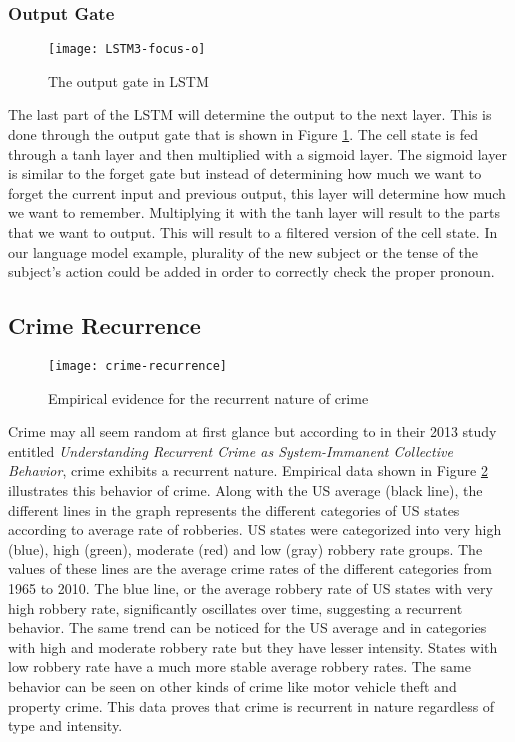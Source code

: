     \subsubsection{Output Gate}
        \begin{figure}[H]
        \centering
        \texttt{[image: LSTM3-focus-o]}
        \caption{The output gate in LSTM \cite{olah2015understanding}}
        \label{fig:lstm-output-gate}
        \end{figure}
        The last part of the LSTM will determine the output to the next layer. This is done through the output gate that is shown in Figure \ref{fig:lstm-output-gate}. The cell state is fed through a tanh layer and then multiplied with a sigmoid layer. The sigmoid layer is similar to the forget gate but instead of determining how much we want to forget the current input and previous output, this layer will determine how much we want to remember. Multiplying it with the tanh layer will result to the parts that we want to output. This will result to a filtered version of the cell state. In our language model example, plurality of the new subject or the tense of the subject's action could be added in order to correctly check the proper pronoun.

\subsection{Crime Recurrence}
    \begin{figure}[H]
        \centering
        \texttt{[image: crime-recurrence]}
        \caption{Empirical evidence for the recurrent nature of crime \cite{perc2013understanding}}
        \label{fig:crime-recurrence}
    \end{figure}
    Crime may all seem random at first glance but according to \cite{perc2013understanding} in their 2013 study entitled \textit{Understanding Recurrent Crime as System-Immanent Collective Behavior}, crime exhibits a recurrent nature. Empirical data shown in Figure \ref{fig:crime-recurrence} illustrates this behavior of crime. Along with the US average (black line), the different lines in the graph represents the different categories of US states according to average rate of robberies. US states were categorized into very high (blue), high (green), moderate (red) and low (gray) robbery rate groups. The values of these lines are the average crime rates of the different categories from 1965 to 2010. The blue line, or the average robbery rate of US states with very high robbery rate, significantly oscillates over time, suggesting a recurrent behavior. The same trend can be noticed for the US average and in categories with high and moderate robbery rate but they have lesser intensity. States with low robbery rate have a much more stable average robbery rates. The same behavior can be seen on other kinds of crime like motor vehicle theft and property crime. This data proves that crime is recurrent in nature regardless of type and intensity.